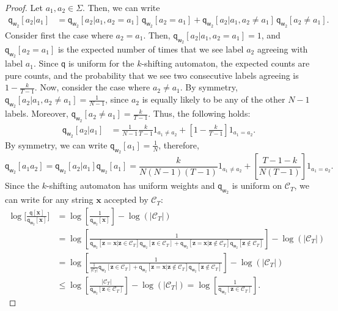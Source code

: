 \documentclass{article}
\newcommand{\sC}{\mathscr C}
\newcommand{\bx}{{\mathbf x}}
\newcommand{\bz}{{\mathbf z}}
\newcommand{\sfq}{{\mathsf q}}
\newcommand{\sfw}{{\mathsf w}}
\begin{document}
\begin{proof}
  Let $a_1, a_2 \in \Sigma$. Then, we can write
\begin{align*}
     \sfq_{\sfw_2}[a_2 | a_1] 
     & = \sfq_{\sfw_2}[a_2 | a_1, a_2 = a_1]\, \sfq_{\sfw_2}[a_2 = a_1] + \sfq_{\sfw_2}[a_2 | a_1, a_2 \neq a_1]\, \sfq_{\sfw_2}[a_2 \neq a_1].
\end{align*}
Consider first the case where $a_2 = a_1$. Then,
$\sfq_{\sfw_2}[a_2 | a_1, a_2 = a_1] = 1$, and
$\sfq_{\sfw_2}[a_2 = a_1]$ is the expected number of times that we see
label $a_2$ agreeing with label $a_1$.  Since $\sfq$ is uniform for
the $k$-shifting automaton, the expected counts are pure counts, and
the probability that we see two consecutive labels agreeing is
$1 - \frac{k}{T-1}$.  Now, consider the case where $a_2 \neq a_1$. By
symmetry, $\sfq_{\sfw_2}[a_2 | a_1, a_2 \neq a_1] = \frac{1}{N-1}$,
since $a_2$ is equally likely to be any of the other $N-1$
labels. Moreover, $\sfq_{\sfw_2}[a_2 \neq a_1] = \frac{k}{T-1}$.
Thus, the following holds:
\begin{align*}
    \sfq_{\sfw_2}[a_2 | a_1]
    & = \frac{1}{N-1}\frac{k}{T-1} 1_{a_1 \neq a_2}  +  \left[ 1 - \frac{k}{T-1} \right] 1_{a_1 = a_2}. 
\end{align*}
By symmetry, we can write $\sfq_{\sfw_2}[a_1] = \frac{1}{N}$,
therefore,
\begin{equation*}
\sfq_{\sfw_2}[a_1a_2] = \sfq_{\sfw_2}[a_2| a_1] \sfq_{\sfw_2}[a_1] = \frac{k}{N(N-1)(T-1)} 1_{a_1 \neq a_2}  +  \left[ \frac{T-1-k}{N(T-1)} \right] 1_{a_1 = a_2}.
\end{equation*}
Since the $k$-shifting automaton has uniform weights and
$\sfq_{\sfw_2}$ is uniform on $\sC_T$, we can write for any string $\bx$
accepted by $\sC_T$:
  \begin{align*}
    \log\bigg[ \frac{\sfq[\bx]}{\sfq_{\sfw_2}[\bx]}\bigg]
    &=  \log\left[ \frac{1}{\sfq_{\sfw_2}[\bx]}\right] - \log(|\sC_T|) \\
    & = \log\left[ \frac{1}{\sfq_{\sfw_2}[\bz=  \bx | \bz \in \sC_T]
      \sfq_{\sfw_2}[\bz \in \sC_T] + \sfq_{\sfw_2}[\bz = \bx | \bz \notin
      \sC_T] \sfq_{\sfw_2}[\bz \notin \sC_T]}\right] - \log(|\sC_T|)\\
    & = \log\left[ \frac{1}{\frac{1}{|\sC_T|} \sfq_{\sfw_2}[\bz \in \sC_T] + \sfq_{\sfw_2}[\bz = \bx | \bz \notin \sC_T] \sfq_{\sfw_2}[\bz \notin \sC_T]}\right]  - \log(|\sC_T|)\\
    & \leq \log\left[ \frac{|\sC_T|}{\sfq_{\sfw_2}[\bz \in \sC_T]} \right]  - \log(|\sC_T|) 
    = \log\left[ \frac{1}{\sfq_{\sfw_2}[\bz \in \sC_T]} \right]. 

\end{align*}
\end{proof}
\end{document}
